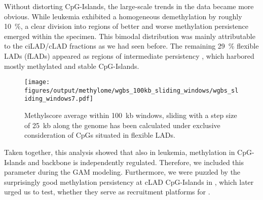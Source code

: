 Without distorting CpG-Islands, the large-scale trends in the data became more obvious. While \dnmtwt \kitpos leukemia exhibited a homogeneous demethylation by roughly \SI{10}{\percent}, a clear division into regions of better and worse methylation persistence emerged within the \dnmtchip specimen. This bimodal distribution was mainly attributable to the ciLAD/cLAD fractions as we had seen before. 
The remaining \SI{29}{\percent} flexible LADs (fLADs) appeared as regions of intermediate persistency , which harbored mostly methylated and stable CpG-Islands.

\begin{figure}[!ht] 
	\centering
	\texttt{[image: figures/output/methylome/wgbs\_100kb\_sliding\_windows/wgbs\_sliding\_windows7.pdf]} 
	\caption[Scatterplot of \SI{100}{\kilo b} restricted to fLADs]{Methylscore average within \SI{100}{\kilo b} windows, sliding with a step size of \SI{25}{\kilo b} along the genome has been calculated under exclusive consideration of CpGs situated in flexible LADs.}
	\label{fig:wgbs_sliding_windows7}
\end{figure}

Taken together, this analysis showed that also in \mllafnine leukemia, methylation in CpG-Islands and backbone is independently regulated. Therefore, we included this parameter during the GAM modeling. Furthermore, we were puzzled by the surprisingly good methylation persistency at cLAD CpG-Islands in \dnmtchip, which later urged us to test, whether they serve as recruitment platforms for .      